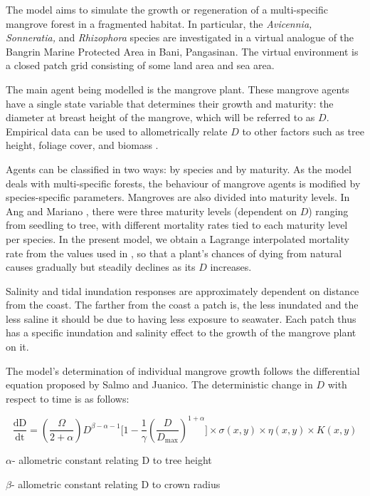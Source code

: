 The model aims to simulate the growth or regeneration of a
multi-specific mangrove forest in a fragmented habitat. In particular,
the \emph{Avicennia, Sonneratia,} and \emph{Rhizophora} species are
investigated in a virtual analogue of the Bangrin Marine Protected Area in
Bani, Pangasinan. The virtual environment is a closed patch grid consisting of
some land area and sea area.

The main agent being modelled is the mangrove plant. These mangrove agents
have a single state variable that determines their growth and maturity:
the diameter at breast height of the mangrove, which will be referred to
as \(D\). Empirical data can be used to allometrically relate $D$ to other
factors such as tree height, foliage cover, and biomass \cite{Hiebeler2000}.

Agents can be classified in two ways: by species and by maturity. As the
model deals with multi-specific forests, the behaviour of mangrove
agents is modified by species-specific parameters. Mangroves are also
divided into maturity levels. In Ang and Mariano \cite{marovesAngMariano}, there were
three maturity levels (dependent on $D$) ranging from seedling to tree,
with different mortality rates tied to each maturity level per species. In
the present model, we obtain a Lagrange interpolated mortality rate from
the values used in \cite{mangrovesAngMariano}, so that a plant's chances of dying from natural causes gradually but steadily declines as its $D$ increases.

Salinity and tidal inundation responses are approximately dependent on
distance from the coast. The farther from the coast a patch is, the less
inundated and the less saline it should be due to having less exposure
to seawater. Each patch thus has a specific inundation and salinity effect to the
growth of the mangrove plant on it.

The model's determination of individual mangrove growth follows the
differential equation proposed by Salmo and Juanico. The deterministic change in $D$ with respect to time is as follows:

\begin{dmath}
\frac{\text{dD}}{\text{dt}} = (\frac{\Omega}{2 + \alpha})D^{\beta - \alpha - 1}\lbrack 1 - \frac{1}{\gamma}{(\frac{D}{D_{\max}})}^{1 + \alpha}\rbrack \times \sigma(x,y) \times \eta(x,y) \times K(x,y)
\end{dmath}


\(\alpha\)- allometric constant relating D to tree height

\(\beta\)- allometric constant relating D to crown radius

